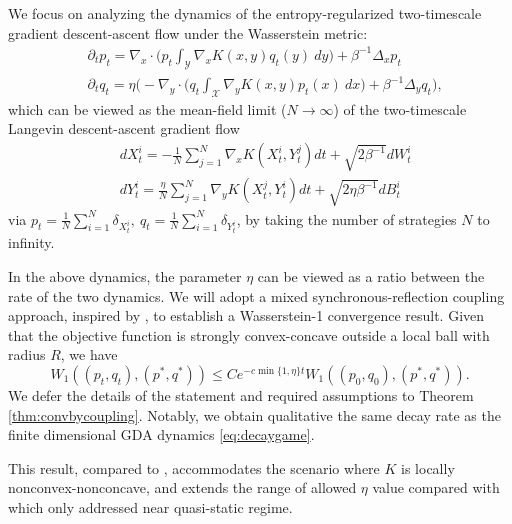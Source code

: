 \documentclass[11pt]{article}
\newcommand{\1}{\mathds{1}}
\renewcommand{\d}{\partial}
\begin{document}
 We focus on analyzing the dynamics of the entropy-regularized two-timescale gradient descent-ascent flow under the Wasserstein metric:
 \begin{subequations}\label{eqn:PDE}
     \begin{align}
         &\d_t p_t = \nabla_x \cdot\big(p_t  \int_{\mathcal{Y}}\nabla_x K(x,y) q_t(y) ~dy\big)+ \beta^{-1}\Delta_x p_t\\
         &\d_t q_t = \eta\Big(-\nabla_y \cdot\Big(q_t \int_{\mathcal{X}}\nabla_y K(x,y) p_t(x) ~dx\Big)+ \beta^{-1}\Delta_y q_t\Big),
     \end{align}
 \end{subequations}
which can be viewed as the mean-field limit ($N \to \infty$) of the two-timescale Langevin descent-ascent gradient flow 
\begin{subequations}\label{eq:meanfieldGDA}
    \begin{align}
        & dX_t^i = -\frac{1}{N}\sum_{j=1}^N \nabla_x K(X_t^i, Y_t^j) dt + \sqrt{2\beta^{-1}} d W_t^i\\
        & dY_t^i = \frac{\eta}{N}\sum_{j=1}^N \nabla_y K(X_t^j, Y_t^i) dt + \sqrt{2\eta\beta^{-1}} d B_t^i
    \end{align}
\end{subequations}
via $p_t = \frac{1}{N}\sum_{i=1}^N \delta_{X_t^i}, ~q_t = \frac{1}{N}\sum_{i=1}^N \delta_{Y_t^i}$, by taking the number of strategies $N$ to infinity. 

In the above dynamics, the parameter $\eta$ can be viewed as a ratio between the rate of the two dynamics.  We will adopt a mixed synchronous-reflection coupling approach, inspired by \cite{eberle2016reflection}, to establish a Wasserstein-1 convergence result. Given that the objective function is strongly convex-concave outside a local ball with radius $R$, we have 
 \begin{equation*}
     W_1((p_t,q_t), (p^*, q^*))\leq  Ce^{-c \min\{1, \eta\} t} W_1((p_0,q_0), (p^*, q^*)).
 \end{equation*}
We defer the details of the statement and required assumptions to Theorem \ref{thm:convbycoupling}. Notably, we obtain qualitative the same decay rate as the finite dimensional GDA dynamics \eqref{eq:decaygame}. 

This result, compared to \cite{conger2024coupled, cai2024convergence}, accommodates the scenario where $K$ is locally nonconvex-nonconcave, and extends the range of allowed $\eta$ value compared with \cite{lu2023two} which only addressed near quasi-static regime.
\end{document}
